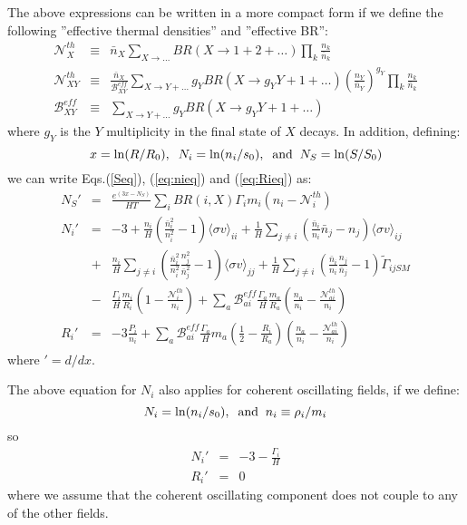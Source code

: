 \documentclass[preprint,notoc]{JHEP3}
\def\to{\rightarrow}
\def\to{\rightarrow}
\begin{document}
 
The above expressions can be written in a more compact form if we define
the following ''effective thermal densities'' and ''effective BR'':
\begin{eqnarray}
\mathcal{N}^{th}_{X} & \equiv &  \bar{n}_X \sum_{X \to \ldots} BR(X \to 1 + 2 +
\ldots)
\prod_{k}
\frac{n_k}{\bar{n}_k} \nonumber \\
\mathcal{N}^{th}_{XY} & \equiv & \frac{\bar{n}_X}{\mathcal{B}^{eff}_{XY}}
\sum_{X \to Y + \ldots} g_Y BR(X \to g_Y Y + 1 + \ldots)
\left(\frac{n_Y}{\bar{n}_Y}\right)^{g_Y} \prod_{k} \frac{n_k}{\bar{n}_k}
\nonumber \\
\mathcal{B}^{eff}_{XY} & \equiv & \sum_{X \to Y + \ldots} g_Y BR(X \to g_Y Y +
1+\ldots) \nonumber
\end{eqnarray}
where $g_Y$ is the $Y$ multiplicity in the final state of $X$ decays. 
In addition, defining:
\begin{equation}
x = \ln(R/R_0),\;\; N_i = \ln(n_i/s_0),\;\; {\rm and}\;\; N_S = \ln(S/S_0)
\end{equation}
we can write Eqs.(\ref{Seq}), (\ref{eq:nieq}) and (\ref{eq:Rieq}) as:
\begin{eqnarray}
N_S' & = & \frac{e^{(3 x - N_S)}}{HT} \sum_{i} BR(i,X) \Gamma_i m_i \left(n_i -
\mathcal{N}_{i}^{th} \right) 
\label{Seqb} \\
N_i' & = & -3 
+ \frac{n_i}{H}\left( \frac{\bar{n}_i^2}{n_i^2} -1 \right) \langle \sigma v \rangle_{ii} 
+ \frac{1}{H} \sum_{j\neq i} \left( \frac{\bar{n}_i}{n_i} \bar{n}_j - n_j \right) \langle \sigma v \rangle_{ij} \nonumber \\
&+& \frac{n_i}{H} \sum_{j\neq i} \left(\frac{\bar{n}_i^2}{n_i^2}\frac{n_j^2}{\bar{n}_j^2}  - 1 \right) \langle \sigma v \rangle_{jj}
+ \frac{1}{H} \sum_{j\neq i} \left(\frac{\bar{n}_i}{n_i}\frac{n_j}{\bar{n}_j}  - 1\right)  \tilde{\Gamma}_{ijSM}  \nonumber \\
&-&  \frac{\Gamma_i}{H} \frac{m_i}{R_i}\left(1 -
\frac{\mathcal{N}_{i}^{th}}{n_i} \right)
 +  \sum_{a} \mathcal{B}_{ai}^{eff} \frac{\Gamma_a}{H}
 \frac{m_a}{R_a}\left(\frac{n_a}{n_i} - \frac{\mathcal{N}_{ai}^{th}}{n_i}
  \right)
 \\
R_i' & = &  -3 \frac{P_i}{n_i} + \sum_{a} \mathcal{B}_{ai}^{eff}
\frac{\Gamma_a}{H} m_a \left( \frac{1}{2} - \frac{R_i}{R_a} \right) \left(\frac{n_a}{n_i} -
\frac{\mathcal{N}_{ai}^{th}}{n_i} \right)
\label{Nieq}
\end{eqnarray}
where $'=d/dx$.

The above equation for $N_i$ also applies for coherent oscillating fields, if we define:
\begin{equation}
N_i = \ln(n_i/s_0),\;\; {\rm and}\;\; n_i \equiv \rho_i/m_i
\end{equation}
so
\begin{eqnarray}
N_i' & = & -3 - \frac{\Gamma_i}{H}  \nonumber \\
R_i'& = & 0 \label{Nico}
\end{eqnarray}
where we assume that the coherent oscillating component does not couple to any of the other fields.
\end{document}
